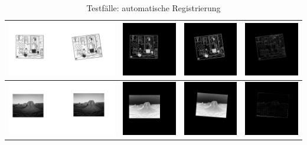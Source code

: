 \documentclass[12pt,german]{article}
\begin{document}
\begin{table}[H]
\begin{tabular}{| c | c | c | c |}
    \hline
    \includegraphics[width=5cm]{images/autoregister/binary2.jpg} &
    \includegraphics[width=2.5cm]{images/autoregister/binary2FH.jpg} &
    \includegraphics[width=2.5cm]{images/autoregister/binary2SH.jpg} &
    \includegraphics[width=2.5cm]{images/autoregister/binary2DIFF.jpg} \\
    \hline
    \includegraphics[width=5cm]{images/autoregister/gray2.jpg} &
    \includegraphics[width=2.5cm]{images/autoregister/gray1FH.jpg} &
    \includegraphics[width=2.5cm]{images/autoregister/gray1SH.jpg} &
    \includegraphics[width=2.5cm]{images/autoregister/gray1DIFF.jpg} \\
    \hline
    
  \end{tabular}
  \caption{Testfälle: automatische Registrierung}
  \label{tab:autoRegisterTest}
\end{table}
\end{document}
